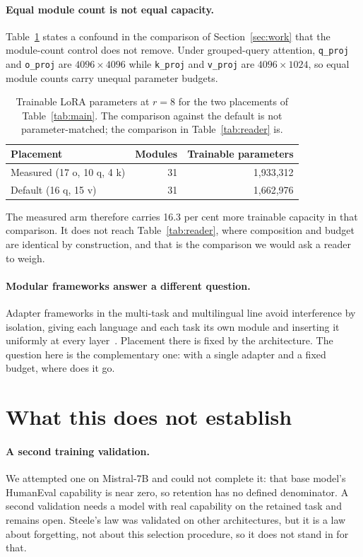 \documentclass[11pt]{article}
\begin{document}
\paragraph{Equal module count is not equal capacity.}
Table~\ref{tab:budget} states a confound in the comparison of
Section~\ref{sec:work} that the module-count control does not remove. Under
grouped-query attention, \texttt{q\_proj} and \texttt{o\_proj} are
$4096 \times 4096$ while \texttt{k\_proj} and \texttt{v\_proj} are
$4096 \times 1024$, so equal module counts carry unequal parameter budgets.

\begin{table}[h]
\centering
\caption{Trainable LoRA parameters at $r=8$ for the two placements of
Table~\ref{tab:main}. The comparison against the default is not
parameter-matched; the comparison in Table~\ref{tab:reader} is.}
\label{tab:budget}
\begin{tabular}{lrr}
\hline
Placement & Modules & Trainable parameters \\
\hline
Measured (17 o, 10 q, 4 k) & 31 & 1{,}933{,}312 \\
Default (16 q, 15 v)       & 31 & 1{,}662{,}976 \\
\hline
\end{tabular}
\end{table}

The measured arm therefore carries 16.3 per cent more trainable capacity in that
comparison. It does not reach Table~\ref{tab:reader}, where composition and
budget are identical by construction, and that is the comparison we would ask a
reader to weigh.

\paragraph{Modular frameworks answer a different question.} Adapter frameworks
in the multi-task and multilingual line avoid interference by isolation, giving
each language and each task its own module and inserting it uniformly at every
layer~\cite{pfeiffer2020madx}. Placement there is fixed by the architecture. The
question here is the complementary one: with a single adapter and a fixed
budget, where does it go.

\section{What this does not establish}

\paragraph{A second training validation.} We attempted one on Mistral-7B and
could not complete it: that base model's HumanEval capability is near zero, so
retention has no defined denominator. A second validation needs a model with
real capability on the retained task and remains open. Steele's law was
validated on other architectures, but it is a law about forgetting, not about
this selection procedure, so it does not stand in for that.
\end{document}
